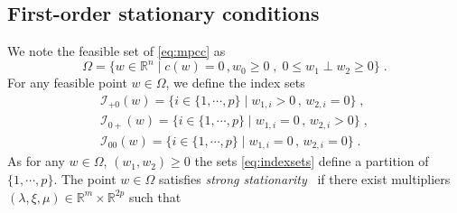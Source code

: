 \documentclass{IEEEtran4PSCC}
\newcommand{\add}[1]{#1}
\begin{document}
\subsection{First-order stationary conditions}
\label{sec:mpcc:stationary}
We note the feasible set of \eqref{eq:mpcc} as
\begin{equation*}
  \Omega = \{ w \in \mathbb{R}^n \; | \; c(w) = 0 \, , w_0 \geq 0 \; ,\; 0 \leq w_1 \perp w_2 \geq 0 \} \; .
\end{equation*}
For any feasible point $w \in \Omega$, we define the index sets
\begin{equation}
  \label{eq:indexsets}
  \begin{aligned}
    \mathcal{I}_{+0}(w) = \{ i \in \{1, \cdots, p\} \; | \; w_{1,i} > 0 \, , \, w_{2,i} = 0 \} \;, \\
    \mathcal{I}_{0+}(w) = \{ i \in \{1, \cdots, p\} \; | \; w_{1,i} = 0 \, , \, w_{2,i} > 0 \} \;, \\
    \mathcal{I}_{00}(w) = \{ i \in \{1, \cdots, p\} \; | \; w_{1,i} = 0 \, , \, w_{2,i} = 0 \} \; .
  \end{aligned}
\end{equation}
\add{As for any $w \in \Omega$, $(w_1, w_2) \geq 0$ the sets \eqref{eq:indexsets} define
a partition of $\{1, \cdots, p\}$.}
The point $w \in \Omega$ satisfies \emph{strong stationarity}~\cite{scheel2000mathematical} if there exist
multipliers $(\lambda, \xi, \mu) \in \mathbb{R}^m \times \mathbb{R}^{2p}$ such that
\end{document}
